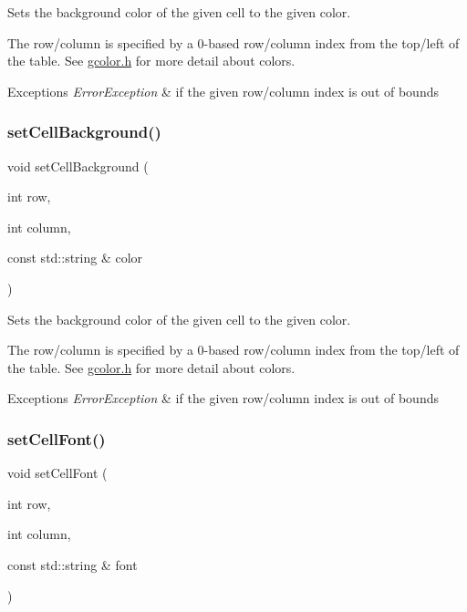 Sets the background color of the given cell to the given color. 

The row/column is specified by a 0-\/based row/column index from the top/left of the table. See \mbox{\hyperlink{gcolor_8h_source}{gcolor.\+h}} for more detail about colors. 
\begin{DoxyExceptions}{Exceptions}
{\em Error\+Exception} & if the given row/column index is out of bounds \\
\hline
\end{DoxyExceptions}
\mbox{\label{classGTable_af2d2fa204d2f9260081102a990310cd7}} 
\subsubsection{\texorpdfstring{set\+Cell\+Background()}{setCellBackground()}\hspace{0.1cm}{\footnotesize\ttfamily [2/2]}}
{\footnotesize\ttfamily void set\+Cell\+Background (\begin{DoxyParamCaption}\item[{int}]{row,  }\item[{int}]{column,  }\item[{const std\+::string \&}]{color }\end{DoxyParamCaption})\hspace{0.3cm}{\ttfamily [virtual]}}



Sets the background color of the given cell to the given color. 

The row/column is specified by a 0-\/based row/column index from the top/left of the table. See \mbox{\hyperlink{gcolor_8h_source}{gcolor.\+h}} for more detail about colors. 
\begin{DoxyExceptions}{Exceptions}
{\em Error\+Exception} & if the given row/column index is out of bounds \\
\hline
\end{DoxyExceptions}
\mbox{\label{classGTable_a8c3d80b0163f465c7306b075d5895313}} 
\subsubsection{\texorpdfstring{set\+Cell\+Font()}{setCellFont()}}
{\footnotesize\ttfamily void set\+Cell\+Font (\begin{DoxyParamCaption}\item[{int}]{row,  }\item[{int}]{column,  }\item[{const std\+::string \&}]{font }\end{DoxyParamCaption})\hspace{0.3cm}{\ttfamily [virtual]}}



